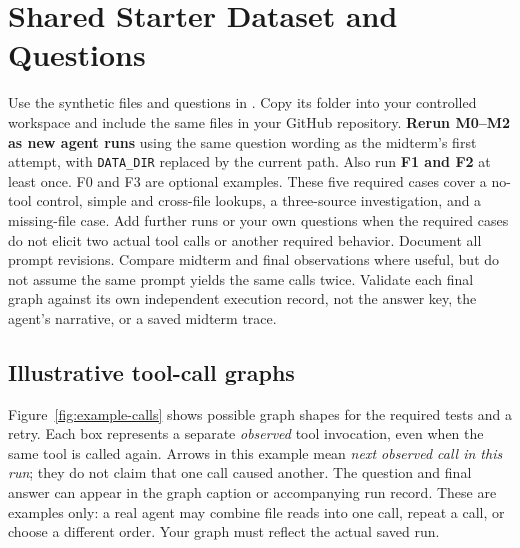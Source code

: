 \documentclass[11pt]{article}
\begin{document}
\section{Shared Starter Dataset and Questions}
Use the synthetic files and questions in . Copy its  folder into your controlled workspace and include the same files in your GitHub repository. \textbf{Rerun M0--M2 as new agent runs} using the same question wording as the midterm's first attempt, with \texttt{DATA\_DIR} replaced by the current path. Also run \textbf{F1 and F2} at least once. F0 and F3 are optional examples. These five required cases cover a no-tool control, simple and cross-file lookups, a three-source investigation, and a missing-file case. Add further runs or your own questions when the required cases do not elicit two actual tool calls or another required behavior. Document all prompt revisions. Compare midterm and final observations where useful, but do not assume the same prompt yields the same calls twice. Validate each final graph against its own independent execution record, not the answer key, the agent's narrative, or a saved midterm trace.

\subsection*{Illustrative tool-call graphs}
Figure~\ref{fig:example-calls} shows possible graph shapes for the required tests and a retry. Each box represents a separate \emph{observed} tool invocation, even when the same tool is called again. Arrows in this example mean \emph{next observed call in this run}; they do not claim that one call caused another. The question and final answer can appear in the graph caption or accompanying run record. These are examples only: a real agent may combine file reads into one call, repeat a call, or choose a different order. Your graph must reflect the actual saved run.
\end{document}
